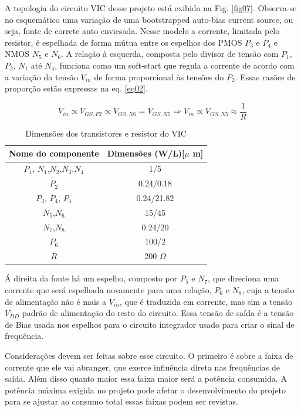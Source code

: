 A topologia do circuito VIC desse projeto está exibida na Fig. \ref{fig07}. Observa-se no esquemático uma variação de uma bootstrapped auto-bias current source, ou seja, fonte de correte auto enviesada. Nesse modelo a corrente, limitada pelo resistor, é espelhada de forma mútua entre os espelhos dos PMOS $P_3$ e $P_4$  e NMOS $N_5$ e $N_6$. 
A relação à esquerda, composta pelo divisor de tensão com $P_1$, $P_2$, $N_1$ até $N_4$, funciona como um soft-start que regula a corrente de acordo com a variação da tensão $V_{in}$ de forma proporcional às tensões do $P_2$. Essas razões de proporção estão expressas na eq. \ref{eq02}.

\begin{equation}
 V_{in}\propto V_{GS,P2}\propto V_{GS,N6} = V_{GS,N5} \Rightarrow V_{in}\propto V_{GS,N5} \approx \frac{1}{R}
 \label{eq02}
\end{equation}


\begin{table}[htb]
\centering
\begin{tabular}{c|c}
\hline 
\hline 
\textbf{Nome do componente} & \textbf{Dimensões (W/L)[$\mu$ m]} \\ 
\hline 
\hline 
$P_1$, $N_1$,$N_2$,$N_3$,$N_4$ & 1/5 \\ 
\hline 
$P_2$ & 0.24/0.18 \\ 
\hline 
$P_3$, $P_4$, $P_5$  & 0.24/21.82 \\ 
\hline 
$N_5$,$N_6$ & 15/45 \\ 
\hline 
$N_7$,$N_8$ & 0.24/20 \\ 
\hline 
$P_6$ & 100/2 \\ 
\hline 
$R$ & 200 $\Omega$ \\ 
\hline 
\end{tabular} 
\caption{Dimensões dos transistores e resistor do VIC}
\label{tab:vic}
\end{table}

 Á direita da fonte há um espelho, composto por $P_5$ e $N_7$, que direciona uma corrente que será espelhada novamente para uma relação, $P_6$ e $N_8$, cuja a tensão de alimentação não é mais a $V_{in}$, que é traduzida em corrente, mas sim a tensão $V_{DD}$ padrão de alimentação do resto do circuito. Essa tensão de saída é a tensão de Bias usada nos espelhos para o circuito integrador usado para criar o sinal de frequência.

Considerações devem ser feitas sobre esse circuito. O primeiro é sobre a faixa de corrente que ele vai abranger, que exerce influência direta nas frequências de saída. Além disso quanto maior essa faixa maior será a potência consumida. A potência máxima exigida no projeto pode afetar o desenvolvimento do projeto para se ajustar ao consumo total essas faixas podem ser revistas.

